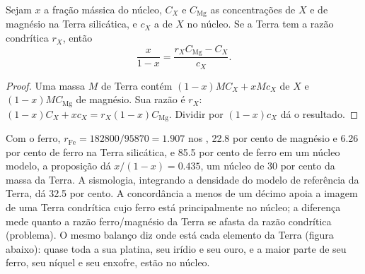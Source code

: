 \begin{proposition}
\label{prop:b2:elements-in-the-earth:core}
Sejam $x$ a fração mássica do núcleo, $C_X$ e $C_{\mathrm{Mg}}$ as
concentrações de $X$ e de magnésio na Terra silicática, e $c_X$ a de $X$ no
núcleo. Se a Terra tem a razão condrítica $r_X$, então
\[
  \frac{x}{1-x} = \frac{r_X C_{\mathrm{Mg}} - C_X}{c_X}.
\]
\end{proposition}

\begin{proof}
Uma massa $M$ de Terra contém $(1-x)MC_X + xMc_X$ de $X$ e $(1-x)MC_{\mathrm{Mg}}$ de
magnésio. Sua razão é $r_X$:
$(1-x)C_X + xc_X = r_X(1-x)C_{\mathrm{Mg}}$. Dividir por $(1-x)c_X$ dá o
resultado.
\end{proof}

Com o ferro, $r_{\mathrm{Fe}} = \num{182800}/\num{95870} = 1.907$ nos ,
22.8 por cento de magnésio e 6.26 por cento de ferro na Terra silicática, e 85.5 por
cento de ferro em um núcleo modelo, a proposição dá $x/(1-x) = 0.435$, um núcleo de 30
por cento da massa da Terra. A sismologia, integrando a densidade do
modelo de referência da Terra, dá 32.5 por cento. A concordância a menos de um décimo
apoia a imagem de uma Terra condrítica cujo ferro está principalmente no núcleo; a
diferença mede quanto a razão ferro/magnésio da Terra se afasta da
razão condrítica (problema). O mesmo balanço diz onde está cada elemento da Terra
(figura abaixo): quase toda a sua platina, seu irídio e seu ouro, e a maior parte de seu ferro,
seu níquel e seu enxofre, estão no núcleo.

\begin{omfigure}
\centering
{}
\par{}
\end{omfigure}

